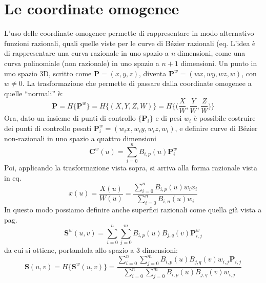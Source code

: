 \chapter{\label{sec:CoordOmogenee}Le coordinate omogenee}
L'uso delle coordinate omogenee permette
di rappresentare in modo alternativo funzioni razionali, quali
quelle viste per le curve di B\'ezier razionali (eq.
L'idea \`e di rappresentare una curva razionale in uno spazio a
\emph{n} dimensioni, come una curva polinomiale (non razionale) in
uno spazio a $n+1$ dimensioni. Un punto in uno spazio 3D, scritto
come $\textbf{P}=(x,y,z)$, diventa $\textbf{P}^{w}=(wx,wy,wz,w)$,
con $w\neq 0$. La trasformazione che permette di passare dalla
coordinate omogenee a quelle ``normali'' \`e:
\begin{displaymath}
\textbf{P}=H\{\textbf{P}^{w}\}=H\{(X,Y,Z,W)\}=H\Big\{ \Big( \frac{X}{W},\frac{Y}{W},\frac{Z}{W} \Big) \Big\}
\end{displaymath}
Ora, dato un insieme di punti di controllo $\{\textbf{P}_{i}\}$ e
di pesi $w_{i}$ \`e possibile costruire dei punti di controllo
pesati $\textbf{P}_{i}^{w}=(w_{i}x,w_{i}y,w_{i}z,w_{i})$, e
definire curve di B\'ezier non-razionali in uno spazio a quattro
dimensioni
\begin{displaymath}
\textbf{C}^{w}(u)=\sum_{i=0}^{n}B_{i,p}(u)\textbf{P}^{w}_{i}
\end{displaymath}
Poi, applicando la trasformazione vista sopra, si arriva alla forma razionale vista in eq. %
\begin{displaymath}
x(u)=\frac{X(u)}{W(u)}=\frac{\displaystyle\sum_{i=0}^{n}B_{i,p}(u)w_{i}x_{i}}
{\displaystyle\sum_{i=0}^{n}B_{i,n}(u)w_{i}}
\end{displaymath}
In questo modo possiamo definire anche superfici razionali come quella gi\`a vista a pag.%
\begin{displaymath}
\textbf{S}^{w}(u,v)=\sum_{i=0}^{n}\sum_{j=0}^{m}B_{i,p}(u)B_{j,q}(v)\textbf{P}^{w}_{i,j}
\end{displaymath}
da cui si ottiene, portandola allo spazio a 3 dimensioni:
\begin{displaymath}
\textbf{S}(u,v)=H\{\textbf{S}^{w}(u,v)\}=
\frac{\sum_{i=0}^{n}\sum_{j=0}^{m}B_{i,p}(u)B_{j,q}(v)w_{i,j}\textbf{P}_{i,j}}
{\sum_{i=0}^{n}\sum_{j=0}^{m}B_{i,p}(u)B_{j,q}(v)w_{i,j}}
\end{displaymath}

